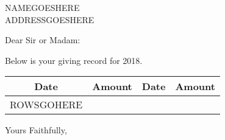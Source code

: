\documentclass{letter}
\begin{document}
\begin{letter}{NAMEGOESHERE \\ ADDRESSGOESHERE}
\opening{Dear Sir or Madam:}
Below is your giving record for 2018.

\begin{center}
  \begin{tabular}{|cr|cr|}
    \hline
    Date & Amount & Date & Amount \\
    \hline
    ROWSGOHERE
    \hline
  \end{tabular}
\end{center}

\closing{Yours Faithfully,}
\end{letter}
\end{document}
